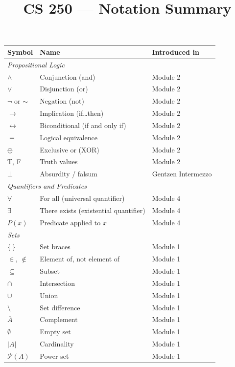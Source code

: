 \documentclass[11pt]{article}
\title{CS 250 --- Notation Summary}
\author{}
\date{}
\begin{document}
\maketitle

{\small
\begin{center}
\begin{tabular}{lll}
\toprule
\textbf{Symbol} & \textbf{Name} & \textbf{Introduced in} \\
\midrule
\multicolumn{3}{l}{\textit{Propositional Logic}} \\[2pt]
$\wedge$ & Conjunction (and) & Module 2 \\
$\vee$ & Disjunction (or) & Module 2 \\
$\lnot$ or $\sim$ & Negation (not) & Module 2 \\
$\to$ & Implication (if\ldots then) & Module 2 \\
$\leftrightarrow$ & Biconditional (if and only if) & Module 2 \\
$\equiv$ & Logical equivalence & Module 2 \\
$\oplus$ & Exclusive or (XOR) & Module 2 \\
T, F & Truth values & Module 2 \\
$\bot$ & Absurdity / falsum & Gentzen Intermezzo \\
\midrule
\multicolumn{3}{l}{\textit{Quantifiers and Predicates}} \\[2pt]
$\forall$ & For all (universal quantifier) & Module 4 \\
$\exists$ & There exists (existential quantifier) & Module 4 \\
$P(x)$ & Predicate applied to $x$ & Module 4 \\
\midrule
\multicolumn{3}{l}{\textit{Sets}} \\[2pt]
$\{\ \}$ & Set braces & Module 1 \\
$\in$, $\notin$ & Element of, not element of & Module 1 \\
$\subseteq$ & Subset & Module 1 \\
$\cap$ & Intersection & Module 1 \\
$\cup$ & Union & Module 1 \\
$\setminus$ & Set difference & Module 1 \\
$\overline{A}$ & Complement & Module 1 \\
$\emptyset$ & Empty set & Module 1 \\
$|A|$ & Cardinality & Module 1 \\
$\mathcal{P}(A)$ & Power set & Module 1 \\

\end{tabular}
\end{center}}
\end{document}
